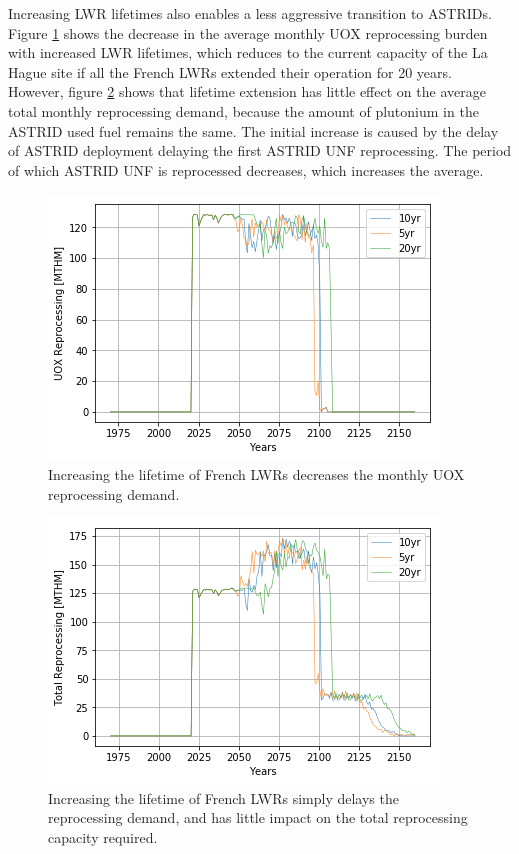  Increasing \gls{LWR} lifetimes also enables a less aggressive transition to 
 \glspl{ASTRID}. 
Figure \ref{fig:ext_uox} shows the decrease in the average monthly
\gls{UOX} reprocessing burden with increased \gls{LWR} lifetimes,
which reduces to the current capacity of the La Hague site if all the
French \glspl{LWR} extended their operation for 20 years.
However, figure \ref{fig:ext_all} shows that lifetime extension has little
effect on the average total monthly reprocessing demand, because
the amount of plutonium in the \gls{ASTRID} used fuel remains the same.
The initial increase is caused by the delay of \gls{ASTRID} deployment
delaying the first \gls{ASTRID} \gls{UNF} reprocessing. The period of which
\gls{ASTRID} \gls{UNF} is reprocessed decreases, which increases
the average.

\begin{figure}[htbp!]
    \begin{center}
        \includegraphics[scale=0.7]{./images/sensitivity/ext_uox_rep.png}
    \end{center}
    \caption{Increasing the lifetime of French \glspl{LWR} decreases the monthly
    \gls{UOX} reprocessing demand.}
    \label{fig:ext_uox}
\end{figure}


\begin{figure}[htbp!]
    \begin{center}
        \includegraphics[scale=0.7]{./images/sensitivity/ext_tot_rep.png}
    \end{center}
    \caption{Increasing the lifetime of French \glspl{LWR} simply delays the
             reprocessing demand, and has little impact on the total 
     reprocessing capacity required.}
    \label{fig:ext_all}
\end{figure}
\FloatBarrier

